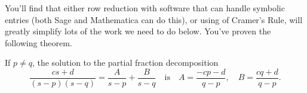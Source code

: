 You'll find that either row reduction with software that can handle symbolic entries (both Sage and Mathematica can do this), or using of Cramer's Rule, will greatly simplify lots of the work we need to do below. You've proven the following theorem.
\begin{theorem}\label{general partial fraction decomposition for a quadratic}
If $p\neq q$, the solution to the partial fraction decomposition
$$
\frac{cs+d}{(s-p)(s-q)} = \frac{A}{s-p}+\frac{B}{s-q}
\quad\text{is}\quad 
A=\frac{-cp-d}{q-p}, \quad B=\frac{cq+d}{q-p}.$$
\end{theorem}
















